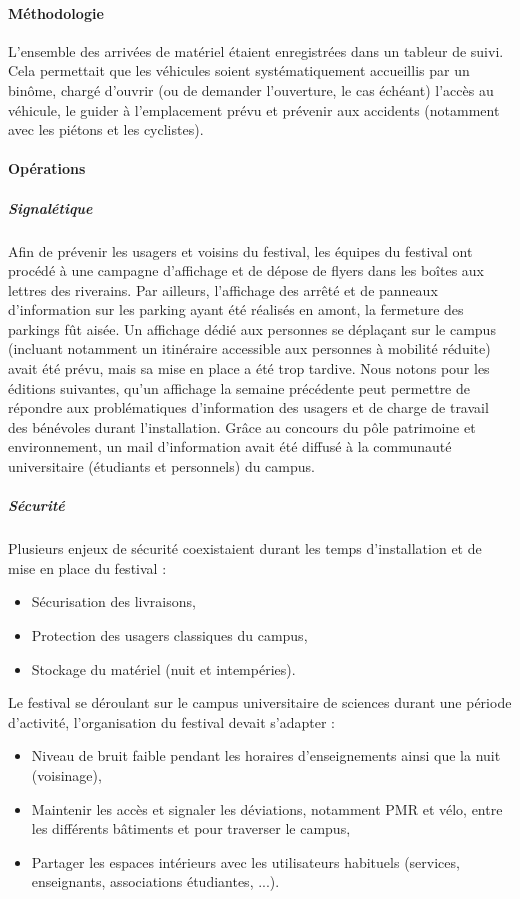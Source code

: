 \documentclass[12pt,a4paper]{report}
\begin{document}
\paragraph{Méthodologie}

L'ensemble des arrivées de matériel étaient enregistrées dans un tableur de suivi. Cela permettait que les véhicules soient systématiquement accueillis par un binôme, chargé d'ouvrir (ou de demander l'ouverture, le cas échéant) l'accès au véhicule, le guider à l'emplacement prévu et prévenir aux accidents (notamment avec les piétons et les cyclistes).

\paragraph{Opérations}

\subparagraph{Signalétique}

Afin de prévenir les usagers et voisins du festival, les équipes du festival ont procédé à une campagne d'affichage et de dépose de flyers dans les boîtes aux lettres des riverains. Par ailleurs, l'affichage des arrêté et de panneaux d'information sur les parking ayant été réalisés en amont, la fermeture des parkings fût aisée. Un affichage dédié aux personnes se déplaçant sur le campus (incluant notamment un itinéraire accessible aux personnes à mobilité réduite) avait été prévu, mais sa mise en place a été trop tardive. Nous notons pour les éditions suivantes, qu'un affichage la semaine précédente peut permettre de répondre aux problématiques d'information des usagers et de charge de travail des bénévoles durant l'installation. Grâce au concours du pôle patrimoine et environnement, un mail d'information avait été diffusé à la communauté universitaire (étudiants et personnels) du campus.

\subparagraph{Sécurité}

Plusieurs enjeux de sécurité coexistaient durant les temps d'installation et de mise en place du festival : 
\begin{itemize}
\item Sécurisation des livraisons,
\item Protection des usagers classiques du campus,
\item Stockage du matériel (nuit et intempéries).\\
\end{itemize} 

Le festival se déroulant sur le campus universitaire de sciences durant une période d'activité, l'organisation du festival devait s'adapter : 
\begin{itemize}
\item Niveau de bruit faible pendant les horaires d'enseignements ainsi que la nuit (voisinage),
\item Maintenir les accès et signaler les déviations, notamment PMR et vélo, entre les différents bâtiments et pour traverser le campus,
\item Partager les espaces intérieurs avec les utilisateurs habituels (services, enseignants, associations étudiantes, ...).\\
\end{itemize}
\end{document}
